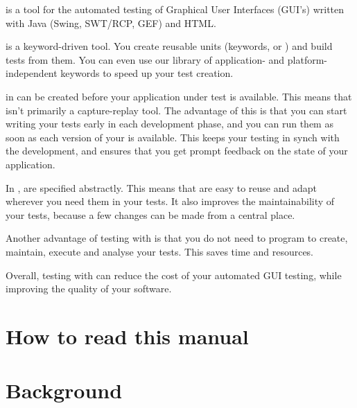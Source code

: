 
\jb{} is a tool for the automated testing of 
Graphical User Interfaces (GUI's) written with Java (Swing, SWT/RCP, GEF) and HTML. 
 
\jb{} is a keyword-driven tool. You create reusable units (keywords, or \gdcases{}) and build tests from them. You can even use our library of application- and platform-independent keywords to speed up your test creation.

\gdcases{} in \jb{} can be created before your application under test \gdaut{} is available. This means that \jb{} isn't primarily a capture-replay tool. The advantage of this is that you can start writing your tests early in each development phase, and you can run them as soon as each version of your \gdaut{} is available. This keeps your testing in synch with the development, and ensures that you get prompt feedback on the state of your application. 

In \jb{}, \gdcases{} are specified abstractly. This means that \gdcases{} are easy to reuse and adapt wherever you need them in your tests. It also improves the maintainability of your tests, because a few changes can be made from a central place. 

Another advantage of testing with \jb{} is that you do not need to program to create, maintain, execute and analyse your tests. This saves time and resources.  

Overall, testing with \jb{} can reduce the cost of your automated GUI testing, while improving the quality of your software. 

\section{How to read this manual}

\clearpage
\section{Background}

\clearpage


